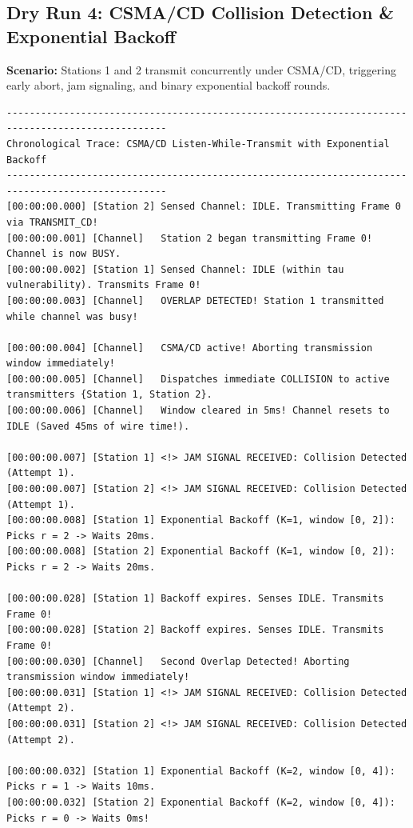 \documentclass[12pt, a4paper]{article}
\begin{document}
\subsection{Dry Run 4: CSMA/CD Collision Detection \& Exponential Backoff}
\textbf{Scenario:} Stations 1 and 2 transmit concurrently under CSMA/CD, triggering early abort, jam signaling, and binary exponential backoff rounds.

\begin{scriptsize}
\begin{verbatim}
--------------------------------------------------------------------------------------------------
Chronological Trace: CSMA/CD Listen-While-Transmit with Exponential Backoff
--------------------------------------------------------------------------------------------------
[00:00:00.000] [Station 2] Sensed Channel: IDLE. Transmitting Frame 0 via TRANSMIT_CD!
[00:00:00.001] [Channel]   Station 2 began transmitting Frame 0! Channel is now BUSY.
[00:00:00.002] [Station 1] Sensed Channel: IDLE (within tau vulnerability). Transmits Frame 0!
[00:00:00.003] [Channel]   OVERLAP DETECTED! Station 1 transmitted while channel was busy!

[00:00:00.004] [Channel]   CSMA/CD active! Aborting transmission window immediately!
[00:00:00.005] [Channel]   Dispatches immediate COLLISION to active transmitters {Station 1, Station 2}.
[00:00:00.006] [Channel]   Window cleared in 5ms! Channel resets to IDLE (Saved 45ms of wire time!).

[00:00:00.007] [Station 1] <!> JAM SIGNAL RECEIVED: Collision Detected (Attempt 1).
[00:00:00.007] [Station 2] <!> JAM SIGNAL RECEIVED: Collision Detected (Attempt 1).
[00:00:00.008] [Station 1] Exponential Backoff (K=1, window [0, 2]): Picks r = 2 -> Waits 20ms.
[00:00:00.008] [Station 2] Exponential Backoff (K=1, window [0, 2]): Picks r = 2 -> Waits 20ms.

[00:00:00.028] [Station 1] Backoff expires. Senses IDLE. Transmits Frame 0!
[00:00:00.028] [Station 2] Backoff expires. Senses IDLE. Transmits Frame 0!
[00:00:00.030] [Channel]   Second Overlap Detected! Aborting transmission window immediately!
[00:00:00.031] [Station 1] <!> JAM SIGNAL RECEIVED: Collision Detected (Attempt 2).
[00:00:00.031] [Station 2] <!> JAM SIGNAL RECEIVED: Collision Detected (Attempt 2).

[00:00:00.032] [Station 1] Exponential Backoff (K=2, window [0, 4]): Picks r = 1 -> Waits 10ms.
[00:00:00.032] [Station 2] Exponential Backoff (K=2, window [0, 4]): Picks r = 0 -> Waits 0ms!


\end{verbatim}
\end{scriptsize}
\end{document}
